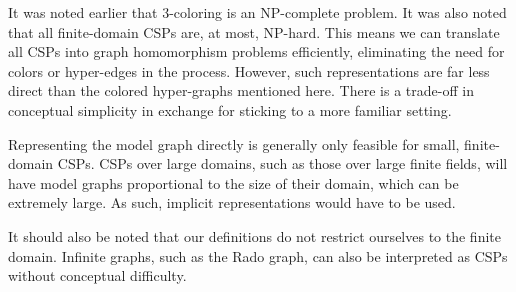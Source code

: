 \begin{remark}\label{remark:just-graphs}
It was noted earlier that 3-coloring is an NP-complete problem. It was also noted that all finite-domain CSPs are, at most, NP-hard. This means we can translate all CSPs into graph homomorphism problems efficiently, eliminating the need for colors or hyper-edges in the process. However, such representations are far less direct than the colored hyper-graphs mentioned here. There is a trade-off in conceptual simplicity in exchange for sticking to a more familiar setting.
\end{remark}

Representing the model graph directly is generally only feasible for small, finite-domain CSPs. CSPs over large domains, such as those over large finite fields, will have model graphs proportional to the size of their domain, which can be extremely large. As such, implicit representations would have to be used.

It should also be noted that our definitions do not restrict ourselves to the finite domain. Infinite graphs, such as the Rado graph, can also be interpreted as CSPs without conceptual difficulty.